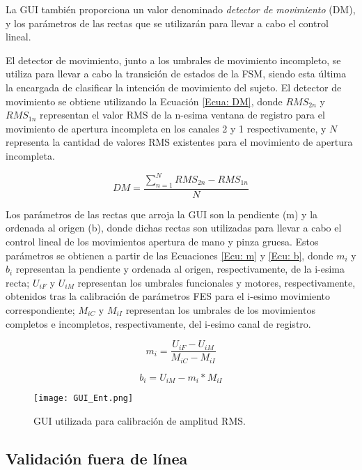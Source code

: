 La GUI también proporciona un valor denominado \emph{detector de movimiento} (DM), y los parámetros de las rectas que se utilizarán para llevar a cabo el control lineal.

El detector de movimiento, junto a los umbrales de movimiento incompleto, se utiliza para llevar a cabo la transición de estados de la FSM, siendo esta última la encargada de clasificar la intención de movimiento del sujeto. El detector de movimiento se obtiene utilizando la Ecuación \ref{Ecua: DM}, donde $RMS_{2n}$ y $RMS_{1n}$ representan el valor RMS de la n-esima ventana de registro para el movimiento de apertura incompleta en los canales 2 y 1 respectivamente, y $N$ representa la cantidad de valores RMS existentes para el movimiento de apertura incompleta.

\begin{equation}
	DM = \frac{\sum_{n=1}^{N}RMS_{2n}-RMS_{1n}}{N}
	\label{Ecua: DM}
\end{equation}

Los parámetros de las rectas que arroja la GUI son la pendiente (m) y la ordenada al origen (b), donde dichas rectas son utilizadas para llevar a cabo el control lineal de los movimientos apertura de mano y pinza gruesa. Estos parámetros se obtienen a partir de las Ecuaciones \ref{Ecu: m} y \ref{Ecu: b}, donde $m_{i}$ y $b_{i}$ representan la pendiente y ordenada al origen, respectivamente, de la i-esima recta; $U_{iF}$ y $U_{iM}$ representan los umbrales funcionales y motores, respectivamente, obtenidos tras la calibración de parámetros FES para el i-esimo movimiento correspondiente; $M_{iC}$ y $M_{iI}$ representan los umbrales de los movimientos completos e incompletos, respectivamente, del i-esimo canal de registro.

\begin{equation}
	m_{i} = \frac{ U_{iF} - U_{iM} }{ M_{iC} - M_{iI} }
	\label{Ecu: m}
\end{equation}

\begin{equation}
	b_{i} = U_{iM} - m_{i}*M_{iI}
	\label{Ecu: b}
\end{equation}

\begin{figure}[htb]
	\centering
	\texttt{[image: GUI\_Ent.png]}
	\caption{GUI utilizada para calibración de amplitud RMS.}
	\label{Figura: GUI_Ent}
\end{figure}

\subsection{Validación fuera de línea}



